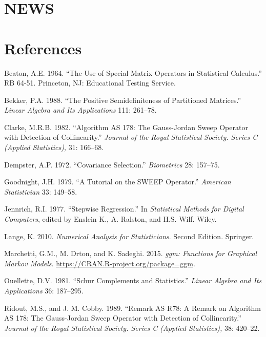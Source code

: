 \documentclass[12pt,]{article}
\begin{document}
\section{NEWS}\label{news}

\section*{References}\label{references}

\hypertarget{refs}{}
\hypertarget{ref-beaton_64}{}
Beaton, A.E. 1964. ``The Use of Special Matrix Operators in Statistical
Calculus.'' RB 64-51. Princeton, NJ: Educational Testing Service.

\hypertarget{ref-bekker_88}{}
Bekker, P.A. 1988. ``The Positive Semidefiniteness of Partitioned
Matrices.'' \emph{Linear Algebra and Its Applications} 111: 261--78.

\hypertarget{ref-clarke_82}{}
Clarke, M.R.B. 1982. ``Algorithm AS 178: The Gauss-Jordan Sweep Operator
with Detection of Collinearity.'' \emph{Journal of the Royal Statistical
Society. Series C (Applied Statistics),} 31: 166--68.

\hypertarget{ref-dempster_72}{}
Dempster, A.P. 1972. ``Covariance Selection.'' \emph{Biometrics} 28:
157--75.

\hypertarget{ref-goodnight_79}{}
Goodnight, J.H. 1979. ``A Tutorial on the SWEEP Operator.''
\emph{American Statistician} 33: 149--58.

\hypertarget{ref-jennrich_77}{}
Jennrich, R.I. 1977. ``Stepwise Regression.'' In \emph{Statistical
Methods for Digital Computers}, edited by Enslein K., A. Ralston, and
H.S. Wilf. Wiley.

\hypertarget{ref-lange_10}{}
Lange, K. 2010. \emph{Numerical Analysis for Statisticians}. Second
Edition. Springer.

\hypertarget{ref-marchetti_drton_sadeghi_15}{}
Marchetti, G.M., M. Drton, and K. Sadeghi. 2015. \emph{ggm: Functions
for Graphical Markov Models}.
\url{https://CRAN.R-project.org/package=ggm}.

\hypertarget{ref-ouellette_81}{}
Ouellette, D.V. 1981. ``Schur Complements and Statistics.'' \emph{Linear
Algebra and Its Applications} 36: 187--295.

\hypertarget{ref-ridout_cobby_89}{}
Ridout, M.S., and J. M. Cobby. 1989. ``Remark AS R78: A Remark on
Algorithm AS 178: The Gauss-Jordan Sweep Operator with Detection of
Collinearity.'' \emph{Journal of the Royal Statistical Society. Series C
(Applied Statistics),} 38: 420--22.
\end{document}

